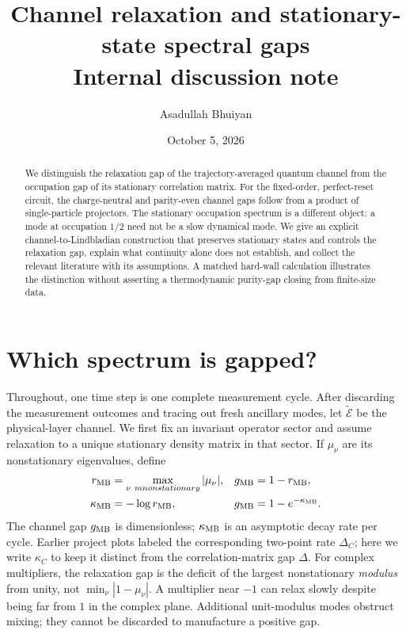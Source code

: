 \documentclass[aps,prb,twocolumn,nofootinbib,superscriptaddress]{revtex4-2}
\newcommand{\E}{\widetilde{\mathcal E}}
\begin{document}
\title{\texorpdfstring{Channel relaxation and stationary-state spectral gaps\\
\large Internal discussion note}{Channel relaxation and stationary-state spectral gaps: Internal discussion note}}
\author{Asadullah Bhuiyan}
\noaffiliation
\date{October 5, 2026}
\begin{abstract}
We distinguish the relaxation gap of the trajectory-averaged quantum channel
from the occupation gap of its stationary correlation matrix. For the fixed-order,
perfect-reset circuit, the charge-neutral and parity-even channel gaps follow
from a product of single-particle projectors. The stationary occupation spectrum
is a different object: a mode at occupation $1/2$ need not be a slow dynamical
mode. We give an explicit channel-to-Lindbladian construction that preserves
stationary states and controls the relaxation gap, explain what continuity alone
does not establish, and collect the relevant literature with its assumptions.
A matched hard-wall calculation illustrates the distinction without asserting a
thermodynamic purity-gap closing from finite-size data.
\end{abstract}
\maketitle
\setcounter{tocdepth}{1}
\tableofcontents

\section{Which spectrum is gapped?}
Throughout, one time step is one complete measurement cycle. After discarding
the measurement outcomes and tracing out fresh ancillary modes, let $\E$ be
the physical-layer channel. We first fix an invariant operator sector and
assume relaxation to a unique stationary density matrix in that sector.
If $\mu_\nu$ are its nonstationary eigenvalues, define
\begin{align}
 r_{\rm MB}&=\max_{\nu\ {
m nonstationary}}|\mu_\nu|,
 &g_{\rm MB}&=1-r_{\rm MB},\label{eq:gap}\\
 \kappa_{\rm MB}&=-\log r_{\rm MB},
 &g_{\rm MB}&=1-e^{-\kappa_{\rm MB}}.\label{eq:rate}
\end{align}
The channel gap $g_{\rm MB}$ is dimensionless; $\kappa_{\rm MB}$ is an
asymptotic decay rate per cycle. Earlier project plots labeled the corresponding
two-point rate $\Delta_C$; here we write $\kappa_C$ to keep it distinct from
the correlation-matrix gap $\Delta$. For complex multipliers, the relaxation
gap is the deficit of the largest nonstationary \emph{modulus} from unity,
not $\min_\nu|1-\mu_\nu|$. A multiplier near $-1$ can relax slowly despite
being far from $1$ in the complex plane. Additional unit-modulus modes obstruct
mixing; they cannot be discarded to manufacture a positive gap.
\end{document}
